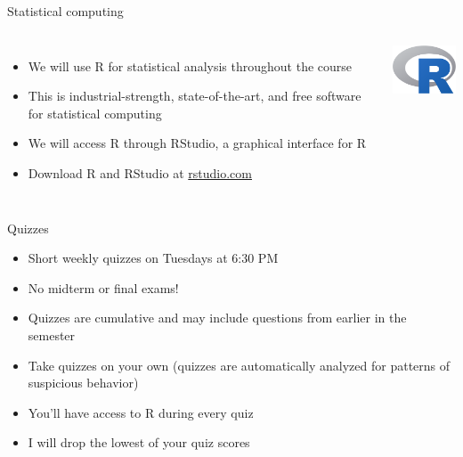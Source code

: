 \documentclass{beamer}\usepackage[]{graphicx}\usepackage[]{color}
\begin{document}
\begin{darkframes}
    \begin{frame}{Statistical computing}
      \begin{columns}[onlytextwidth]
          \begin{itemize}
            \item We will use \alert{R} for statistical analysis throughout the course
            \item This is industrial-strength, state-of-the-art, and free software for statistical computing
            \item We will access R through \alert{RStudio}, a graphical interface for R
            \item Download R and RStudio at \url{rstudio.com}
          \end{itemize}
          \includegraphics[width=1in]{R}
      \end{columns}
    \end{frame}

    \begin{frame}{Quizzes}
      \begin{itemize}
        \item Short weekly quizzes on Tuesdays at 6:30 PM
        \item No midterm or final exams!
        \item Quizzes are cumulative and may include questions from earlier in the semester
        \item Take quizzes on your own (quizzes are automatically analyzed for patterns of suspicious behavior)
        \item You'll have access to R during every quiz
        \item I will drop the lowest of your quiz scores
      \end{itemize}
    \end{frame}


\end{darkframes}
\end{document}
